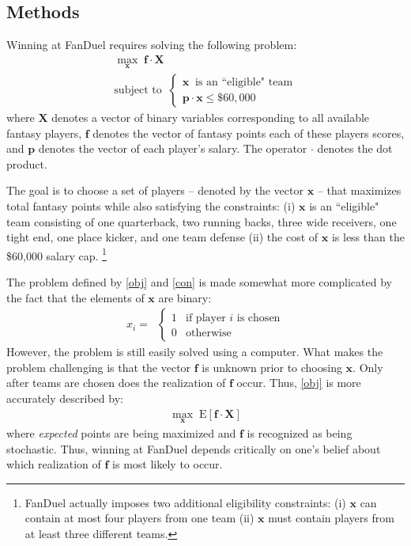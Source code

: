 \documentclass[10pt]{article}
\begin{document}
\thispagestyle{fancy}


\subsection*{Methods}

\noindent Winning at FanDuel requires solving the following problem:
\begin{gather}
\label{obj}
\max_{\bm{x}} \; {\bm f} \cdot {\bm X} \\
\label{con}
\text{subject to} \; \; \left\{
	\begin{array}{l}
	{\bm x} \; \; \text{is an ``eligible" team} \\
	{\bm p} \cdot {\bm x} \leq \$60,000
	\end{array} \right.
\end{gather}
where $\bm{X}$ denotes a vector of binary variables corresponding to all available fantasy players, ${\bm f}$ denotes the vector of fantasy points each of these players scores, and $\bm{p}$ denotes the vector of each player's salary.  The operator $\cdot$ denotes the dot product.

The goal is to choose a set of players -- denoted by the vector ${\bm x}$ -- that maximizes total fantasy points while also satisfying the constraints: (i) $\bm{x}$ is an ``eligible" team consisting of one quarterback, two running backs, three wide receivers, one tight end, one place kicker, and one team defense (ii) the cost of $\bm{x}$ is less than the \$60,000 salary cap.%
%
\footnote{FanDuel actually imposes two additional eligibility constraints: (i) $\bm{x}$ can contain at most four players from one team (ii) $\bm{x}$ must contain players from at least three different teams.}
%

The problem defined by \eqref{obj} and \eqref{con} is made somewhat more complicated by the fact that the elements of $\bm{x}$ are binary:
\begin{gather}
x_i = \; \; \left \{
	\begin{array}{ll}
	1 & \text{if player $i$ is chosen} \\
	0 & \text{otherwise}
	\end{array} \right.
\end{gather}
However, the problem is still easily solved using a computer.  What makes the problem challenging is that the vector $\bm{f}$ is unknown prior to choosing $\bm{x}$.  Only after teams are chosen does the realization of $\bm{f}$ occur.  Thus, \eqref{obj} is more accurately described by:
\begin{gather}
\label{obj.exp}
\max_{\bm{x}} \; \text{E} \left[ {\bm f} \cdot {\bm X} \right ]
\end{gather}
where \emph{expected} points are being maximized and $\bm{f}$ is recognized as being stochastic.  Thus, winning at FanDuel depends critically on one's belief about which realization of $\bm{f}$ is most likely to occur.
\end{document}
